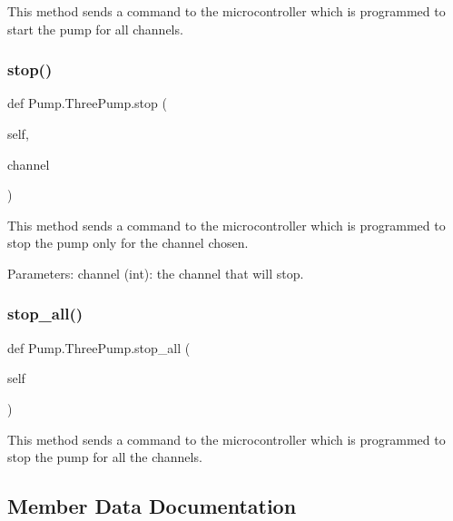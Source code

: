 \begin{DoxyVerb}This method sends a command to the microcontroller which is programmed to start the pump for all channels.
\end{DoxyVerb}
 \mbox{\label{class_pump_1_1_three_pump_afa6004e95a824a9ce1cc082a821d75a2}} 
\subsubsection{\texorpdfstring{stop()}{stop()}}
{\footnotesize\ttfamily def Pump.\+Three\+Pump.\+stop (\begin{DoxyParamCaption}\item[{}]{self,  }\item[{}]{channel }\end{DoxyParamCaption})}

\begin{DoxyVerb}This method sends a command to the microcontroller which is programmed to stop the pump only for the channel chosen.

Parameters:
    channel (int): the channel that will stop.
\end{DoxyVerb}
 \mbox{\label{class_pump_1_1_three_pump_ad03f8166958397980225c3051c9ce9b3}} 
\subsubsection{\texorpdfstring{stop\_all()}{stop\_all()}}
{\footnotesize\ttfamily def Pump.\+Three\+Pump.\+stop\+\_\+all (\begin{DoxyParamCaption}\item[{}]{self }\end{DoxyParamCaption})}

\begin{DoxyVerb}This method sends a command to the microcontroller which is programmed to stop the pump for all the channels.
\end{DoxyVerb}
 

\subsection{Member Data Documentation}
\mbox{\label{class_pump_1_1_three_pump_abc5f0f88b998c6ffbcac39f509f8276d}} 
